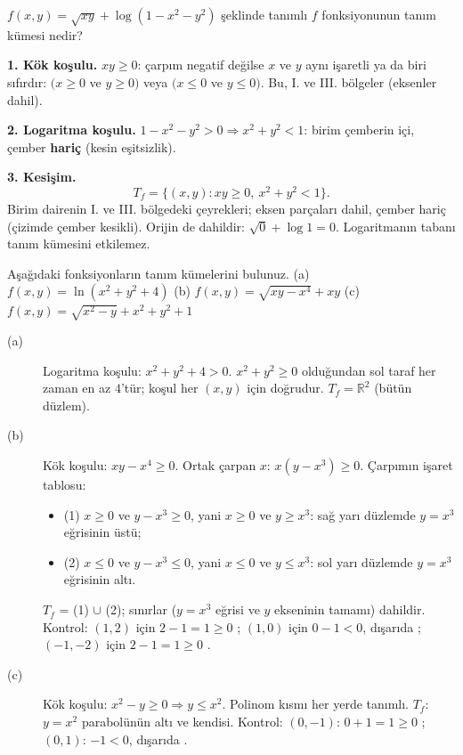 \begin{soru}
$f(x,y)=\sqrt{xy}+\log(1-x^2-y^2)$ şeklinde tanımlı $f$ fonksiyonunun tanım kümesi nedir?
\end{soru}
\begin{cevap}
\textbf{1. Kök koşulu.} $xy\ge0$: çarpım negatif değilse $x$ ve $y$ aynı işaretli ya da biri sıfırdır:
$(x\ge0$ ve $y\ge0)$ veya $(x\le0$ ve $y\le0)$. Bu, I. ve III. bölgeler (eksenler dahil).

\textbf{2. Logaritma koşulu.} $1-x^2-y^2>0\Rightarrow x^2+y^2<1$: birim çemberin içi, çember \textbf{hariç} (kesin
eşitsizlik).

\textbf{3. Kesişim.}
\[
T_f=\{(x,y): xy\ge0,\ x^2+y^2<1\}.
\]
Birim dairenin I. ve III. bölgedeki çeyrekleri; eksen parçaları dahil, çember hariç (çizimde çember kesikli).
Orijin de dahildir: $\sqrt0+\log1=0$. Logaritmanın tabanı tanım kümesini etkilemez.
\end{cevap}

\begin{soru}
Aşağıdaki fonksiyonların tanım kümelerini bulunuz.
(a) $f(x,y)=\ln(x^2+y^2+4)$ \quad (b) $f(x,y)=\sqrt{xy-x^4}+xy$ \quad (c) $f(x,y)=\sqrt{x^2-y}+x^2+y^2+1$
\end{soru}
\begin{cevap}
\begin{description}
  \item[(a)] Logaritma koşulu: $x^2+y^2+4>0$. $x^2+y^2\ge0$ olduğundan sol taraf her zaman en az $4$'tür; koşul her
  $(x,y)$ için doğrudur. $T_f=\mathbb R^2$ (bütün düzlem).
  \item[(b)] Kök koşulu: $xy-x^4\ge0$. Ortak çarpan $x$: $x(y-x^3)\ge0$. Çarpımın işaret tablosu:
  \begin{itemize}
    \item (1) $x\ge0$ ve $y-x^3\ge0$, yani $x\ge0$ ve $y\ge x^3$: sağ yarı düzlemde $y=x^3$ eğrisinin üstü;
    \item (2) $x\le0$ ve $y-x^3\le0$, yani $x\le0$ ve $y\le x^3$: sol yarı düzlemde $y=x^3$ eğrisinin altı.
  \end{itemize}
  $T_f$ = (1) $\cup$ (2); sınırlar ($y=x^3$ eğrisi ve $y$ ekseninin tamamı) dahildir. Kontrol: $(1,2)$ için
  $2-1=1\ge0$ \checkmark; $(1,0)$ için $0-1<0$, dışarıda \checkmark; $(-1,-2)$ için $2-1=1\ge0$ \checkmark.
  \item[(c)] Kök koşulu: $x^2-y\ge0\Rightarrow y\le x^2$. Polinom kısmı her yerde tanımlı. $T_f$: $y=x^2$ parabolünün
  altı ve kendisi. Kontrol: $(0,-1)$: $0+1=1\ge0$ \checkmark; $(0,1)$: $-1<0$, dışarıda \checkmark.
\end{description}
\end{cevap}

